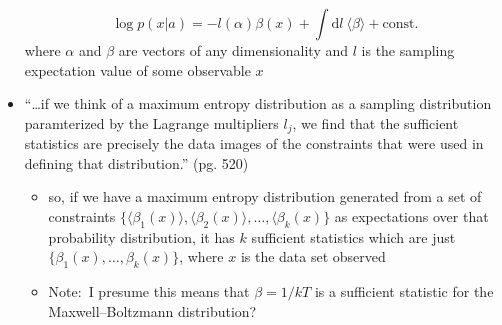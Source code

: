 \documentclass[../jaynes_prob_theory_notes.tex]{subfiles}
\begin{document}
\begin{itemize}
                    \begin{equation*} 
                        \log p(x|a) = - l(\alpha) \beta (x) + \int \text{d}l~\langle \beta \rangle + \text{const.}
                    \end{equation*}
                    where \(\alpha\) and \(\beta\) are vectors of any dimensionality and \(l\) is the sampling expectation value of some observable \(x\)
                \item ``\ldots if we think of a maximum entropy distribution as a sampling distribution paramterized by the Lagrange multipliers \(l_j\), we find that the sufficient statistics are precisely the data images of the constraints that were used in defining that distribution.'' (pg. 520)
                    \begin{itemize} 
                        \item so, if we have a maximum entropy distribution generated from a set of constraints \(\{\langle \beta_1 (x) \rangle, \langle \beta_2 (x) \rangle, \ldots, \langle \beta_k (x) \}\) as expectations over that probability distribution, it has \(k\) sufficient statistics which are just \(\{\beta_1 (x), \ldots, \beta_k (x)\}\), where \(x\) is the data set observed
                        \item Note:\ I presume this means that \(\beta = 1/kT\) is a sufficient statistic for the Maxwell--Boltzmann distribution?
                    \end{itemize}
            \end{itemize}
\end{document}

